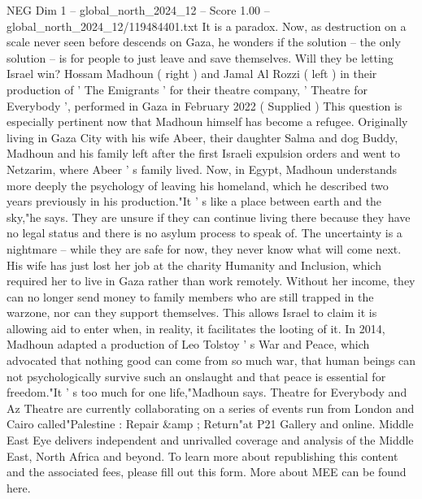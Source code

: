 \begin{textsample}{NEG Dim 1 – global\_north\_2024\_12 – Score 1.00 – global\_north\_2024\_12/119484401.txt}
It is a paradox.
Now, as destruction on a scale never seen before descends on Gaza, he wonders if the solution -- the only solution -- is for people to just leave and save themselves.
Will they be letting Israel win?
Hossam Madhoun ( right ) and Jamal Al Rozzi ( left ) in their production of ' The Emigrants ' for their theatre company, ' Theatre for Everybody ', performed in Gaza in February 2022 ( Supplied ) This question is especially pertinent now that Madhoun himself has become a refugee.
Originally living in Gaza City with his wife Abeer, their daughter Salma and dog Buddy, Madhoun and his family left after the first Israeli expulsion orders and went to Netzarim, where Abeer ' s family lived.
Now, in Egypt, Madhoun understands more deeply the psychology of leaving his homeland, which he described two years previously in his production."It ' s like a place between earth and the sky,"he says.
They are unsure if they can continue living there because they have no legal status and there is no asylum process to speak of.
The uncertainty is a nightmare -- while they are safe for now, they never know what will come next.
His wife has just lost her job at the charity Humanity and Inclusion, which required her to live in Gaza rather than work remotely.
Without her income, they can no longer send money to family members who are still trapped in the warzone, nor can they support themselves.
This allows Israel to claim it is allowing aid to enter when, in reality, it facilitates the looting of it.
In 2014, Madhoun adapted a production of Leo Tolstoy ' s War and Peace, which advocated that nothing good can come from so much war, that human beings can not psychologically survive such an onslaught and that peace is essential for freedom."It ' s too much for one life,"Madhoun says.
Theatre for Everybody and Az Theatre are currently collaborating on a series of events run from London and Cairo called"Palestine : Repair \&amp ; Return"at P21 Gallery and online.
Middle East Eye delivers independent and unrivalled coverage and analysis of the Middle East, North Africa and beyond.
To learn more about republishing this content and the associated fees, please fill out this form.
More about MEE can be found here.

\end{textsample}
